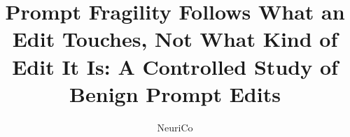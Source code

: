 \documentclass{article}
\title{Prompt Fragility Follows What an Edit Touches, Not What Kind of Edit It Is: A Controlled Study of Benign Prompt Edits}
\author{NeuriCo}
\begin{document}
\maketitle

\begin{abstract}

\end{abstract}










\appendix

\end{document}
